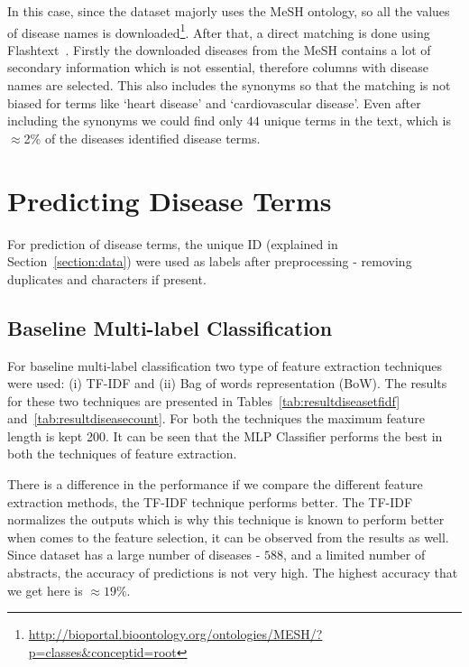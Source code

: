 In this case, since the dataset majorly uses the MeSH ontology, so all the values of disease names is downloaded\footnote{\url{http://bioportal.bioontology.org/ontologies/MESH/?p=classes&conceptid=root}}. After that, a direct matching is done using Flashtext~\cite{2017arXiv171100046S}. Firstly the downloaded diseases from the MeSH contains a lot of secondary information which is not essential, therefore columns with disease names are selected. This also includes the synonyms so that the matching is not biased for terms like `heart disease' and `cardiovascular disease'. Even after including the synonyms we could find only $44$ unique terms in the text, which is $\approx$2\% of the diseases identified disease terms.



\section{Predicting Disease Terms}
For prediction of disease terms, the unique ID (explained in Section~\ref{section:data}) were used as labels after preprocessing - removing duplicates and characters if present. 

\subsection{Baseline Multi-label Classification}
For baseline multi-label classification two type of feature extraction techniques were used: (i) TF-IDF and (ii) Bag of words representation (BoW). The results for these two techniques are presented in Tables~\ref{tab:resultdiseasetfidf} and~\ref{tab:resultdiseasecount}. For both the techniques the maximum feature length is kept 200. It can be seen that the MLP Classifier performs the best in both the techniques of feature extraction. 

There is a difference in the performance if we compare the different feature extraction methods, the TF-IDF technique performs better. The TF-IDF normalizes the outputs which is why this technique is known to perform better when comes to the feature selection, it can be observed from the results as well. 
Since dataset has a large number of diseases - $588$, and a limited number of abstracts, the accuracy of predictions is not very high. The highest accuracy that we get here is $\approx 19\%$. 

